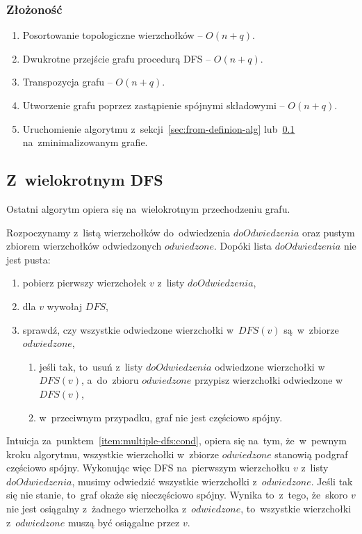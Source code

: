 \documentclass[a4paper,12pt]{mwart}
\begin{document}
\subsubsection{Złożoność}

\begin{enumerate}
\item Posortowanie topologiczne wierzchołków -- $O(n + q)$.
\item Dwukrotne przejście grafu procedurą DFS -- $O(n + q)$.
\item Transpozycja grafu -- $O(n + q)$.
\item Utworzenie grafu poprzez zastąpienie spójnymi składowymi -- $O(n + q)$.
\item Uruchomienie algorytmu z~sekcji~\ref{sec:from-definion-alg}
  lub~\ref{sec:multiple-dfs} na~zminimalizowanym grafie.
\end{enumerate}

\subsection{Z~wielokrotnym DFS}
\label{sec:multiple-dfs}

Ostatni algorytm opiera się na~wielokrotnym przechodzeniu grafu.

Rozpoczynamy z~listą wierzchołków do~odwiedzenia $doOdwiedzenia$ oraz pustym zbiorem
wierzchołków odwiedzonych $odwiedzone$. Dopóki lista $doOdwiedzenia$ nie jest pusta:
\begin{enumerate}
\item pobierz pierwszy wierzchołek $v$ z~listy $doOdwiedzenia$,
\item dla $v$ wywołaj $DFS$,
\item\label{item:multiple-dfs:cond} sprawdź, czy wszystkie odwiedzone
  wierzchołki w~$DFS(v)$ są~w~zbiorze $odwiedzone$,
\begin{enumerate}[label*=\arabic*.]
\item jeśli tak, to~usuń z~listy $doOdwiedzenia$ odwiedzone wierzchołki w~$DFS(v)$,
  a~do~zbioru $odwiedzone$ przypisz wierzchołki odwiedzone w~$DFS(v)$,
\item w~przeciwnym przypadku, graf nie jest częściowo spójny.
\end{enumerate}
\end{enumerate}

Intuicja za~punktem~\ref{item:multiple-dfs:cond}, opiera się na~tym,
że~w~pewnym kroku algorytmu, wszystkie wierzchołki w~zbiorze $odwiedzone$ stanowią
podgraf częściowo spójny. Wykonując więc DFS na~pierwszym wierzchołku $v$
z~listy $doOdwiedzenia$, musimy odwiedzić wszystkie wierzchołki z~$odwiedzone$. Jeśli
tak się nie stanie, to~graf okaże się nieczęściowo spójny. Wynika to~z~tego,
że~skoro $v$ nie jest osiągalny z~żadnego wierzchołka z~$odwiedzone$, to~wszystkie
wierzchołki z~$odwiedzone$ muszą być osiągalne przez $v$.
\end{document}
